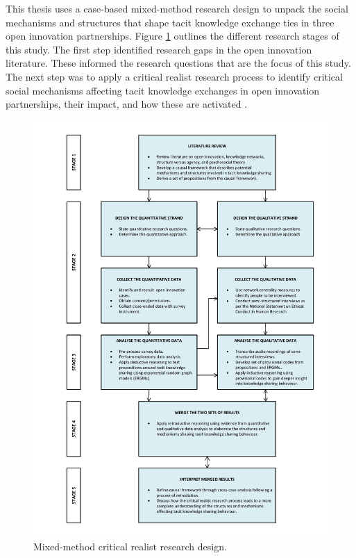 This thesis uses a case-based mixed-method research design to unpack the social mechanisms and structures that shape tacit knowledge exchange ties in three open innovation partnerships. Figure \ref{fig:mm} outlines the different research stages of this study. The first step identified research gaps in the open innovation literature. These informed the research questions that are the focus of this study. The next step was to apply a critical realist research process to identify critical social mechanisms affecting tacit knowledge exchanges in open innovation partnerships, their impact, and how these are activated \citep{mcavoy2018critical}. \medskip

\begin{figure}[p]
\centering
\includegraphics[width = 1.0\textwidth]{Images/mm.pdf}
\caption[Mixed-method research design]{Mixed-method critical realist research design.}
\label{fig:mm}
\end{figure}

